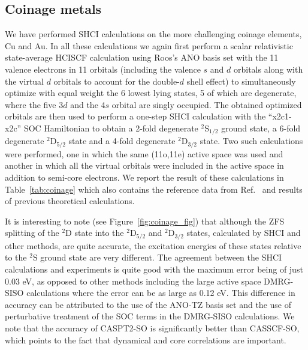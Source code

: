 \documentclass[10pt,aps,prb,twocolumn,amsmath,amssymb,superscriptaddress]{revtex4-1}
\begin{document}
\subsection{Coinage metals}

We have performed SHCI calculations on the more challenging coinage elements, Cu and Au. In all these calculations we again first perform a scalar relativistic state-average HCISCF calculation using Roos's ANO basis set\cite{BjornO.Roos2005}
with the 11 valence electrons in 11 orbitals
(including the valence $s$ and $d$ orbitals along with the virtual $d$ orbitals to account for the double-$d$ shell effect)
to simultaneously optimize with equal weight the 6 lowest lying states, 5 of which are degenerate, where the five 3$d$ and the 4$s$ orbital are singly occupied.
The obtained optimized orbitals are then used to perform a one-step SHCI calculation with the ``x2c1-x2c'' SOC Hamiltonian to obtain a 2-fold degenerate $^2\text{S}_{1/2}$ ground state, a 6-fold degenerate $^2\text{D}_{5/2}$ state and a 4-fold degenerate $^2\text{D}_{3/2}$ state. Two such calculations were performed, one in which the same (11o,11e) active space was used and another in which all the virtual orbitals were included in the active space in addition to semi-core electrons. We report the result of these calculations in Table~\ref{tab:coinage} which also contains the reference data from Ref.~ and results of previous theoretical calculations.

It is interesting to note (see Figure~\ref{fig:coinage_fig}) that although the ZFS splitting of the $^2\text{D}$ state into the $^2\text{D}_{5/2}$ and $^2\text{D}_{3/2}$ states, calculated by SHCI and other methods, are quite accurate, the excitation energies of these states relative to the $^2\text{S}$ ground state are very different. The agreement between the SHCI calculations and experiments is quite good with the maximum error being of just 0.03 eV, as opposed to other methods including the
large active space DMRG-SISO\cite{Sayfutyarova2016} calculations where the error can be as large as 0.12 eV. This difference in accuracy can be attributed to the use of the ANO-TZ basis set and the use of perturbative treatment of the SOC terms in the DMRG-SISO calculations. We note that the accuracy of CASPT2-SO\cite{Malmqvist2002} is significantly better than CASSCF-SO\cite{Malmqvist2002}, which points to the fact that dynamical and core correlations are important. %
\end{document}
